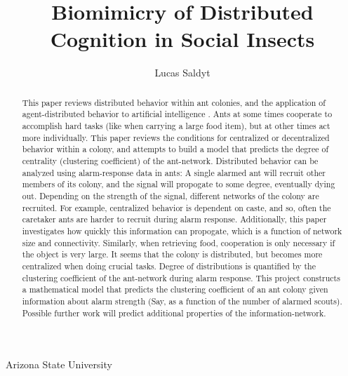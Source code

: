 \documentclass{nature}
\title{Biomimicry of Distributed Cognition in Social Insects}
\author{Lucas Saldyt}
\begin{document}
\maketitle

\begin{affiliations}
 \item Arizona State University
\end{affiliations}

\begin{abstract}
    This paper reviews distributed behavior within ant colonies, and the application of agent-distributed behavior to artificial intelligence \cite{brabazon2016distributed, dorigo2011ant}.
    Ants at some times cooperate to accomplish hard tasks (like when carrying a large food item), but at other times act more individually\cite{feinerman2017individual}.
    This paper reviews the conditions for centralized or decentralized behavior within a colony, and attempts to build a model that predicts the degree of centrality (clustering coefficient) of the ant-network.
    Distributed behavior can be analyzed using alarm-response data in ants: A single alarmed ant will recruit other members of its colony, and the signal will propogate to some degree, eventually dying out.
    Depending on the strength of the signal, different networks of the colony are recruited.
    For example, centralized behavior is dependent on caste, and so, often the caretaker ants are harder to recruit during alarm response.
    Additionally, this paper investigates how quickly this information can propogate, which is a function of network size and connectivity. 
    Similarly, when retrieving food, cooperation is only necessary if the object is very large.
    It seems that the colony is distributed, but becomes more centralized when doing crucial tasks. 
    Degree of distributions is quantified by the clustering coefficient of the ant-network during alarm response\cite{saramaki2007generalizations}.
    This project constructs a mathematical model that predicts the clustering coefficient of an ant colony given information about alarm strength (Say, as a function of the number of alarmed scouts). 
    Possible further work will predict additional properties of the information-network.


\end{abstract}
\end{document}
